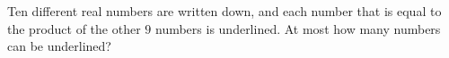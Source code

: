 Ten different real numbers are written down, and each number that is equal to the product of the other $9$ numbers is underlined. At most how many numbers can be underlined?
